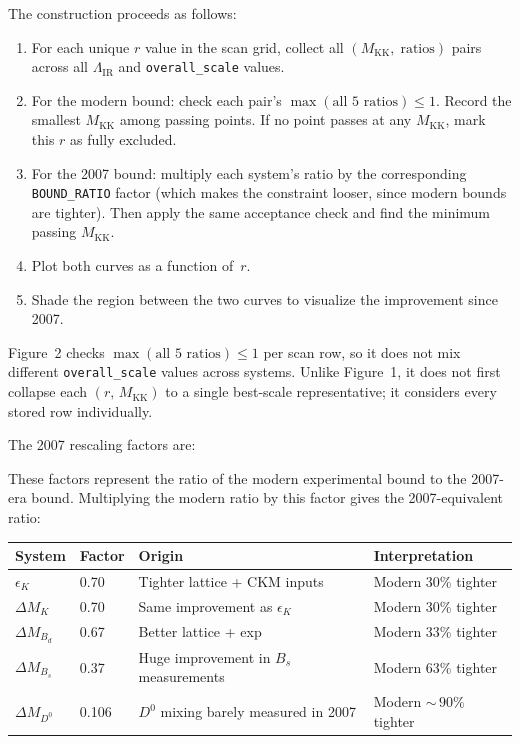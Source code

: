 \documentclass[11pt]{article}
\newcommand{\Mkk}{M_{\mathrm{KK}}}
\newcommand{\LamIR}{\Lambda_{\mathrm{IR}}}
\begin{document}
The construction proceeds as follows:
\begin{enumerate}
  \item For each unique $r$ value in the scan grid, collect all
    $(\Mkk,\;\text{ratios})$ pairs across all $\LamIR$ and
    \texttt{overall\_scale} values.
  \item For the modern bound: check each pair's
    $\max(\text{all 5 ratios}) \le 1$.  Record the smallest $\Mkk$ among
    passing points.  If no point passes at any $\Mkk$, mark this $r$ as fully
    excluded.
  \item For the 2007 bound: multiply each system's ratio by the
    corresponding \texttt{BOUND\_RATIO} factor (which makes the constraint
    looser, since modern bounds are tighter).  Then apply the same acceptance
    check and find the minimum passing $\Mkk$.
  \item Plot both curves as a function of~$r$.
  \item Shade the region between the two curves to visualize the improvement
    since 2007.
\end{enumerate}

Figure~2 checks $\max(\text{all 5 ratios}) \le 1$ per scan row, so it does not
mix different \texttt{overall\_scale} values across systems. Unlike Figure~1, it
does not first collapse each $(r,\,\Mkk)$ to a single best-scale
representative; it considers every stored row individually.

The 2007 rescaling factors are:

These factors represent the ratio of the modern experimental bound to the
2007-era bound.  Multiplying the modern ratio by this factor gives the
2007-equivalent ratio:

\begin{table}[h]
\centering
\begin{tabular}{@{}llll@{}}
\toprule
System & Factor & Origin & Interpretation \\
\midrule
$\epsilon_K$ & 0.70 & Tighter lattice + CKM inputs & Modern 30\% tighter \\
$\Delta M_K$ & 0.70 & Same improvement as $\epsilon_K$ & Modern 30\% tighter \\
$\Delta M_{B_d}$ & 0.67 & Better lattice + exp & Modern 33\% tighter \\
$\Delta M_{B_s}$ & 0.37 & Huge improvement in $B_s$ measurements &
  Modern 63\% tighter \\
$\Delta M_{D^0}$ & 0.106 & $D^0$ mixing barely measured in 2007 &
  Modern ${\sim}\,90\%$ tighter \\
\bottomrule
\end{tabular}
\end{table}
\end{document}

